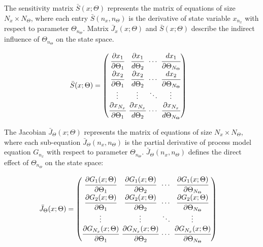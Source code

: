 \documentclass[a4paper,fleqn]{cas-dc}
\begin{document}
	The sensitivity matrix $\bar{S}(x;\Theta)$ represents the matrix of equations of size $N_x \times N_\Theta$, where each entry $\bar{S}(n_x,n_\Theta)$ is the derivative of state variable $x_{n_x}$ with respect to parameter $\Theta_{n_\Theta}$. Matrix ${\bar{J}_x}(x;\Theta)$ and $\bar{S}(x;\Theta)$ describe the indirect influence of $\Theta_{n_\Theta}$ on the state space.
	
	{\footnotesize
		\begin{equation}
			\begin{split}
				\bar{S}(x;\Theta) & = 
				\begingroup %
				\setlength\arraycolsep{2pt}
				\begin{pmatrix}
					\cfrac{\partial {x_{1}}}{\partial {\Theta_{1}}} 	& \cfrac{\partial {x_{1}}}{d {\Theta_{2}}}     & \cdots & \cfrac{d {x_{1}}}{\partial {\Theta_{N_\Theta}}}\\
					\cfrac{\partial {x_{2}}}{\partial {\Theta_{1}}} 	& \cfrac{\partial {x_{2}}}{d {\Theta_{2}}}     & \cdots & \cfrac{d {x_{2}}}{\partial {\Theta_{N_\Theta}}}\\
					\vdots					 	    & \vdots 					   	  & \ddots & \vdots\\
					\cfrac{\partial {x_{N_x}}}{\partial {\Theta_{1}}} 	& \cfrac{\partial {x_{N_x}}}{d {\Theta_{2}}}     & \cdots & \cfrac{\partial {x_{N_x}}}{d {\Theta_{N_\Theta}}}
				\end{pmatrix} 
				\endgroup
			\end{split}
	\end{equation} }
	
	The Jacobian ${\bar{J}_\Theta}(x;\Theta)$ represents the matrix of equations of size $N_x \times N_\Theta$, where each sub-equation ${\bar{J}_\Theta}(n_x,n_\Theta)$ is the partial derivative of process model equation $G_{n_x}$ with respect to parameter $\Theta_{n_\Theta}$. ${\bar{J}_\Theta}(n_x,n_\Theta)$ defines the direct effect of $\Theta_{n_\Theta}$ on the state space:
	
	{\footnotesize
		\begin{align}
			{\bar{J}_\Theta}(x;\Theta) & =
			\begingroup %
			\setlength\arraycolsep{2pt}
			\begin{pmatrix}
				\cfrac{\partial {G_{1}}(x;\Theta)}{\partial {\Theta_{1}}} & \cfrac{\partial {G_{1}}(x;\Theta)}{\partial {\Theta_{2}}} & \cdots & \cfrac{\partial {G_{1}}(x;\Theta)}{\partial {\Theta_{N_\Theta}}}\\
				\cfrac{\partial {G_{2}}(x;\Theta)}{\partial {\Theta_{1}}} & \cfrac{\partial {G_{2}}(x;\Theta)}{\partial {\Theta_{2}}} & \cdots & \cfrac{\partial {G_{2}}(x;\Theta)}{\partial {\Theta_{N_\Theta}}}\\
				\vdots & \vdots & \ddots & \vdots\\
				\cfrac{\partial {G_{N_x}}(x;\Theta)}{\partial {\Theta_{1}}} & \cfrac{\partial {G_{N_x}}(x;\Theta)}{\partial {\Theta_{2}}} & \cdots & \cfrac{\partial {G_{N_x}}(x;\Theta)}{\partial {\Theta_{N_\Theta}}}
			\end{pmatrix}
			\endgroup
	\end{align}}
	
\end{document}
